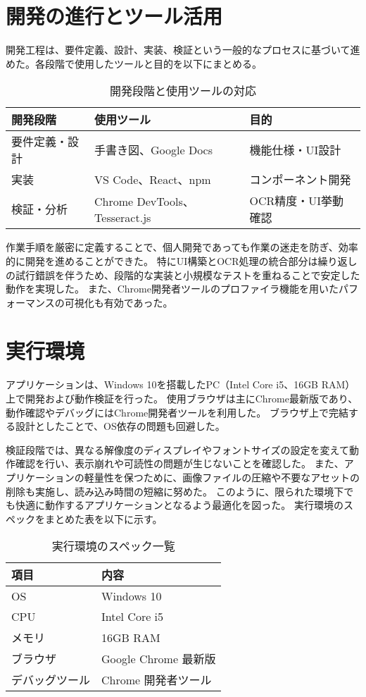 \documentclass[main]{subfiles}
\begin{document}
\section{開発の進行とツール活用}

開発工程は、要件定義、設計、実装、検証という一般的なプロセスに基づいて進めた。各段階で使用したツールと目的を以下にまとめる。

\begin{table}[htbp]
\centering
\caption{開発段階と使用ツールの対応}
\label{tab:dev_phases}
\begin{tabular}{lll}
\hline
開発段階 & 使用ツール & 目的 \\
\hline
要件定義・設計 & 手書き図、Google Docs & 機能仕様・UI設計 \\
実装 & VS Code、React、npm & コンポーネント開発 \\
検証・分析 & Chrome DevTools、Tesseract.js & OCR精度・UI挙動確認 \\
\hline
\end{tabular}
\end{table}

作業手順を厳密に定義することで、個人開発であっても作業の迷走を防ぎ、効率的に開発を進めることができた。
特にUI構築とOCR処理の統合部分は繰り返しの試行錯誤を伴うため、段階的な実装と小規模なテストを重ねることで安定した動作を実現した。
また、Chrome開発者ツールのプロファイラ機能を用いたパフォーマンスの可視化も有効であった。

\section{実行環境}

アプリケーションは、Windows 10を搭載したPC（Intel Core i5、16GB RAM）上で開発および動作検証を行った。
使用ブラウザは主にChrome最新版であり、動作確認やデバッグにはChrome開発者ツールを利用した。
ブラウザ上で完結する設計としたことで、OS依存の問題も回避した。

検証段階では、異なる解像度のディスプレイやフォントサイズの設定を変えて動作確認を行い、表示崩れや可読性の問題が生じないことを確認した。
また、アプリケーションの軽量性を保つために、画像ファイルの圧縮や不要なアセットの削除も実施し、読み込み時間の短縮に努めた。
このように、限られた環境下でも快適に動作するアプリケーションとなるよう最適化を図った。
実行環境のスペックをまとめた表を以下に示す。

\begin{table}[htbp]
\centering
\caption{実行環境のスペック一覧}
\label{tab:execution_environment}
\begin{tabular}{ll}
\hline
項目 & 内容 \\
\hline
OS & Windows 10 \\
CPU & Intel Core i5 \\
メモリ & 16GB RAM \\
ブラウザ & Google Chrome 最新版 \\
デバッグツール & Chrome 開発者ツール \\
\hline
\end{tabular}
\end{table}
\end{document}
